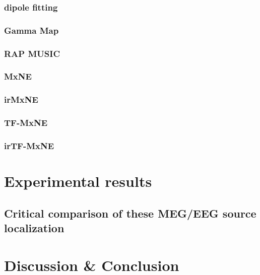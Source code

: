\subsubsection{dipole fitting}
\subsubsection{Gamma Map}
\subsubsection{RAP MUSIC}
\subsubsection{MxNE}
\subsubsection{irMxNE}
\subsubsection{TF-MxNE}
\subsubsection{irTF-MxNE}

\section{Experimental results}

\subsection{Critical comparison of these MEG/EEG source localization}
\section{Discussion \& Conclusion}